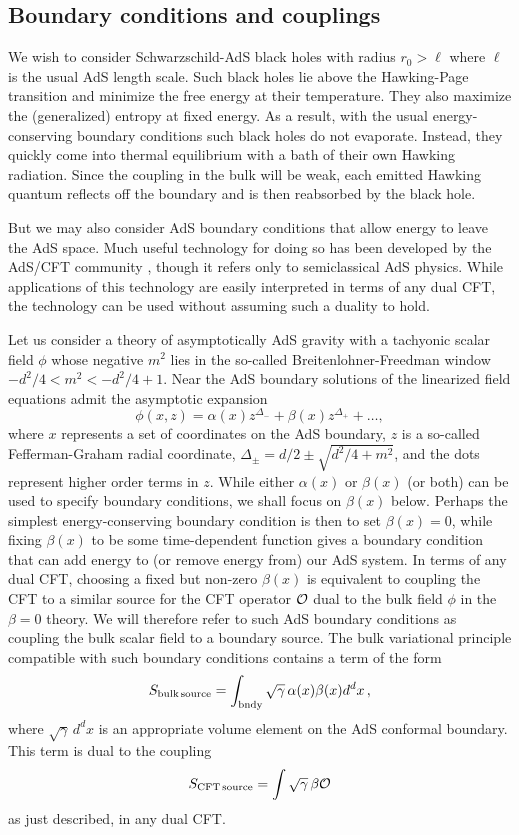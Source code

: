\documentclass[12pt]{article}
\newcommand{\be}{\begin{equation}}
\newcommand{\ee}{\end{equation}}
\begin{document}
\subsection{Boundary conditions and couplings}
\label{AdSAMPS}

We wish to consider Schwarzschild-AdS black holes with radius $r_0 > \ell$ where $\ell$ is the usual AdS length scale.  Such black holes lie above the Hawking-Page transition and minimize the free energy at their temperature.  They also maximize the (generalized) entropy at fixed energy.  As a result, with the usual energy-conserving boundary conditions such black holes do not evaporate.  Instead, they quickly come into thermal equilibrium with a bath of their own Hawking radiation.  Since the coupling in the bulk will be weak,  each emitted Hawking quantum reflects off the boundary and is then reabsorbed by the black hole.

But we may also consider AdS boundary conditions that allow energy to leave the AdS space.  Much useful technology for doing so has been developed by the AdS/CFT community \cite{Witten:2001ua,Berkooz:2002ug,Gubser:2002vv}, though it refers only to semiclassical AdS physics.  While applications of this technology are easily interpreted in terms of any dual CFT, the technology can be used without assuming such a duality to hold.

Let us consider a theory of asymptotically AdS gravity with a tachyonic scalar field $\phi$ whose negative $m^2$ lies in the so-called Breitenlohner-Freedman window
$-d^2/4 < m^2 < -d^2/4 +1$.  Near the AdS boundary solutions of the linearized field equations admit the asymptotic expansion
\begin{equation}
\phi (x,z) = \alpha(x) z^{\Delta_-} +  \beta(x) z^{\Delta_+} + \dots,
\end{equation}
where $x$ represents a set of coordinates on the AdS boundary, $z$ is a so-called Fefferman-Graham radial coordinate, $\Delta_\pm = d/2 \pm \sqrt{d^2/4 + m^2}$, and the dots represent higher order terms in $z$. While either $\alpha(x)$ or $\beta(x)$ (or both) can be used to specify boundary conditions, we shall focus on $\beta(x)$ below.  Perhaps the simplest energy-conserving boundary condition is then to set $\beta(x) =0$, while fixing $\beta(x)$ to be some time-dependent function gives a boundary condition that can add energy to (or remove energy from) our AdS system.  In terms of any dual CFT, choosing a fixed but non-zero $\beta(x)$ is equivalent to coupling the CFT to a similar source for the CFT operator ${\cal O}$ dual to the bulk field $\phi$ in the $\beta=0$ theory.  We will therefore refer to such AdS boundary conditions as coupling the bulk scalar field to a boundary source.  The bulk variational principle compatible with such boundary conditions contains a term of the form
\be
S_{\rm bulk \, source} = \int_{\rm bndy} \sqrt{\gamma} \,\alpha(x) \beta(x) d^dx\,,
\ee
where $\sqrt{\gamma}\, d^dx$ is an appropriate volume element on the AdS conformal boundary.  This term is dual to the coupling \be
S_{\rm CFT \, source} = \int \sqrt{\gamma}\, \beta {\cal O}
\ee
 as just described, in any dual CFT.
\end{document}
